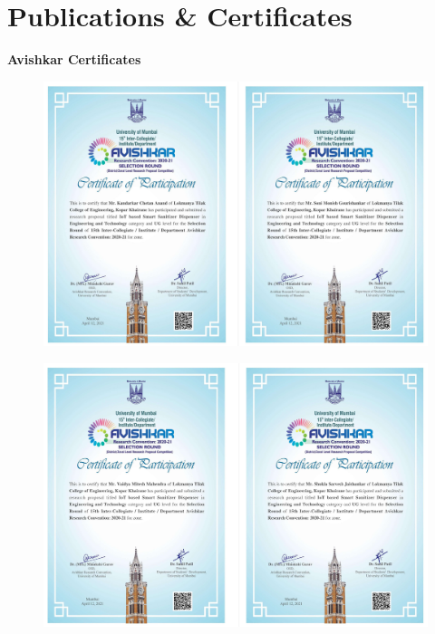 \newpage
\thispagestyle{empty}

\chapter{Publications \& Certificates}

   \begin{flushleft}	 
	\hspace{0.5cm} \large \textbf{Avishkar Certificates} 
	\vspace{0.3cm} 
	\end{flushleft} 
 
   \begin{figure}[h]
		\centering
	\includegraphics[width=140mm,scale=1]{certi1}
\end{figure}

\newpage

\vspace{3cm}
   \begin{figure}[h]
		\centering
	\includegraphics[width=140mm,scale=1]{certi2}
\end{figure}
 
